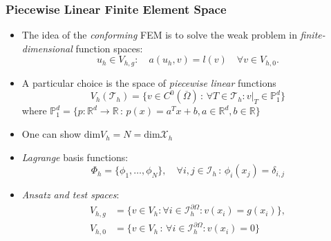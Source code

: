 \documentclass[ignorenonframetext,11pt]{beamer}
\theoremstyle{definition}
\begin{document}
\begin{frame}
\frametitle{Piecewise Linear Finite Element Space}
\begin{itemize} 
\item The idea of the {\em conforming} FEM is to solve the weak problem
in {\em finite-dimensional} function spaces:
\begin{equation*}
u_h\in V_{h,g} : \quad a(u_h,v) = l(v) \quad \forall v\in V_{h,0} .
\end{equation*}
\item A particular choice is the space of {\em piecewise linear} functions
\begin{equation*}
V_h(\mathcal{T}_h) = \{ v\in C^0(\overline{\Omega}) \,:\, 
\forall T\in\mathcal{T}_h : v|_T\in\mathbb{P}_1^d\}
\end{equation*}
where $\mathbb{P}_1^d = \{ p : \mathbb{R}^d \to \mathbb{R}
\,:\, p(x) = a^Tx+ b, a\in\mathbb{R}^d, b\in\mathbb{R}\}$
\item One can show $\text{dim} V_h = N = \text{dim} \mathcal{X}_h$
\item {\em Lagrange} basis functions:
$$\Phi_h=\{\phi_1,\ldots,\phi_N\}, \quad
\forall i,j\in\mathcal{I}_h \,:\, \phi_i(x_j) = \delta_{i,j}$$
\item {\em Ansatz and test spaces}:
\begin{align*}
V_{h,g} &= \{v\in V_h : \forall i\in\mathcal{I}_h^{\partial\Omega} : v(x_i)=g(x_i)\}, \\ 
V_{h,0} &= \{v\in V_h \,:\, \forall i\in\mathcal{I}_h^{\partial\Omega} : v(x_i)=0\}
\end{align*}
\end{itemize}
\end{frame}
\end{document}

